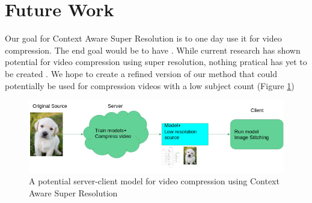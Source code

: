 \section{Future Work}

Our goal for Context Aware Super Resolution is to one day use it for video
compression. The end goal would be to have . While current research has shown
potential for video compression using super resolution, nothing pratical has yet
to be created \cite{Molina,Kappeler2016}. We hope to create a refined version of our method that
could potentially be used for compression videos with a low subject count
(Figure \ref{fig:compression})

\begin{figure}
    \centering
    \includegraphics[width=.45\textwidth]{images/compression.png}
    \caption{A potential server-client model for video compression using Context Aware Super Resolution}
    \label{fig:compression}
\end{figure}
